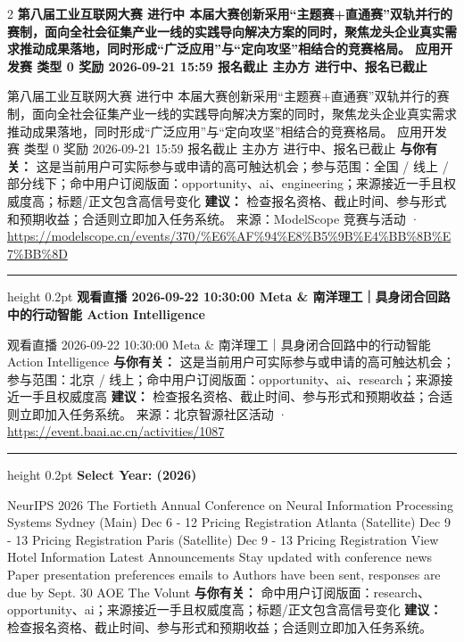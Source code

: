 \documentclass[10.5pt]{ctexart}
\begin{document}
\begin{multicols}{2}
{\large\bfseries 第八届工业互联网大赛 进行中 本届大赛创新采用“主题赛+直通赛”双轨并行的赛制，面向全社会征集产业一线的实践导向解决方案的同时，聚焦龙头企业真实需求推动成果落地，同时形成“广泛应用”与“定向攻坚”相结合的竞赛格局。 应用开发赛 类型 0 奖励 2026-09-21 15:59 报名截止 主办方 进行中、报名已截止}\par
第八届工业互联网大赛 进行中 本届大赛创新采用“主题赛+直通赛”双轨并行的赛制，面向全社会征集产业一线的实践导向解决方案的同时，聚焦龙头企业真实需求推动成果落地，同时形成“广泛应用”与“定向攻坚”相结合的竞赛格局。 应用开发赛 类型 0 奖励 2026-09-21 15:59 报名截止 主办方 进行中、报名已截止
\textbf{与你有关：} 这是当前用户可实际参与或申请的高可触达机会；参与范围：全国 / 线上 / 部分线下；命中用户订阅版面：opportunity、ai、engineering；来源接近一手且权威度高；标题/正文包含高信号变化
\textbf{建议：} 检查报名资格、截止时间、参与形式和预期收益；合适则立即加入任务系统。
{\footnotesize\color{ormuted} 来源：ModelScope 竞赛与活动 · \url{https://modelscope.cn/events/370/%E6%AF%94%E8%B5%9B%E4%BB%8B%E7%BB%8D}}
\vspace{2mm}
\hrule height 0.2pt
\vspace{2mm}
{\large\bfseries 观看直播 2026-09-22 10:30:00 Meta \& 南洋理工｜具身闭合回路中的行动智能 Action Intelligence}\par
观看直播 2026-09-22 10:30:00 Meta \& 南洋理工｜具身闭合回路中的行动智能 Action Intelligence
\textbf{与你有关：} 这是当前用户可实际参与或申请的高可触达机会；参与范围：北京 / 线上；命中用户订阅版面：opportunity、ai、research；来源接近一手且权威度高
\textbf{建议：} 检查报名资格、截止时间、参与形式和预期收益；合适则立即加入任务系统。
{\footnotesize\color{ormuted} 来源：北京智源社区活动 · \url{https://event.baai.ac.cn/activities/1087}}
\vspace{2mm}
\hrule height 0.2pt
\vspace{2mm}
{\large\bfseries Select Year: (2026)}\par
NeurIPS 2026 The Fortieth Annual Conference on Neural Information Processing Systems Sydney (Main) Dec 6 - 12 Pricing Registration Atlanta (Satellite) Dec 9 - 13 Pricing Registration Paris (Satellite) Dec 9 - 13 Pricing Registration View Hotel Information Latest Announcements Stay updated with conference news Paper presentation preferences emails to Authors have been sent, responses are due by Sept. 30 AOE The Volunt
\textbf{与你有关：} 命中用户订阅版面：research、opportunity、ai；来源接近一手且权威度高；标题/正文包含高信号变化
\textbf{建议：} 检查报名资格、截止时间、参与形式和预期收益；合适则立即加入任务系统。

\end{multicols}
\end{document}
